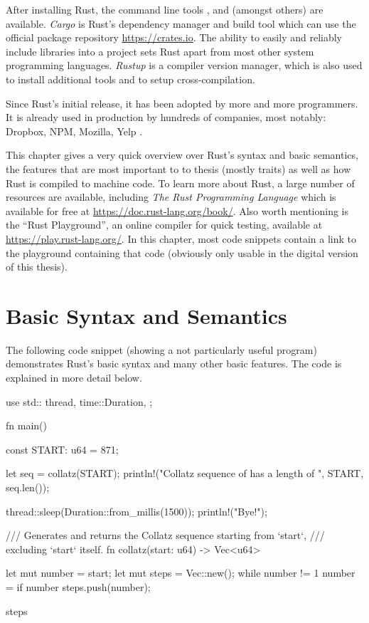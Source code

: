 After installing Rust, the command line tools ,  and  (amongst others) are available.
\emph{Cargo} is Rust's dependency manager and build tool which can use the official package repository \url{https://crates.io}.
The ability to easily and reliably include libraries into a project sets Rust apart from most other system programming languages.
\emph{Rustup} is a compiler version manager, which is also used to install additional tools and to setup cross-compilation.

Since Rust's initial release, it has been adopted by more and more programmers.
It is already used in production by hundreds of companies, most notably: Dropbox, NPM, Mozilla, Yelp \cite{rust-production}.

This chapter gives a very quick overview over Rust's syntax and basic semantics, the features that are most important to to thesis (mostly traits) as well as how Rust is compiled to machine code.
To learn more about Rust, a large number of resources are available, including \emph{The Rust Programming Language} \cite{klabnik2018rust} which is available for free at \url{https://doc.rust-lang.org/book/}.
Also worth mentioning is the \enquote{Rust Playground}, an online compiler for quick testing, available at \url{https://play.rust-lang.org/}.
In this chapter, most code snippets contain a link to the playground containing that code (obviously only usable in the digital version of this thesis).


\section{Basic Syntax and Semantics}

The following code snippet (showing a not particularly useful program) demonstrates Rust's basic syntax and many other basic features.
The code is explained in more detail below.


\begin{rustcode}
use std::{
    thread,
    time::Duration,
};

fn main() {
    const START: u64 = 871;

    let seq = collatz(START);
    println!("Collatz sequence of {} has a length of {}", START, seq.len());

    thread::sleep(Duration::from_millis(1500));
    println!("Bye!");
}

/// Generates and returns the Collatz sequence starting from `start`,
/// excluding `start` itself.
fn collatz(start: u64) -> Vec<u64> {
    let mut number = start;
    let mut steps = Vec::new();
    while number != 1 {
        number = if number %
        steps.push(number);
    }

    steps
}
\end{rustcode}

